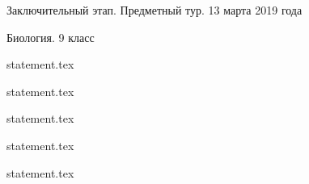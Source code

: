\documentclass[a4paper,11pt, oneside]{book}
\begin{document}
\vspace{-3mm}
\vspace{-5mm}

\normalsize

\begin{center}
    Заключительный этап. Предметный тур. 13 марта 2019 года
    
    Биология. 9 класс
\end{center}

\parindent=0cm

{statement.tex}

{statement.tex}

{statement.tex}

\newpage

{statement.tex}

\newpage

{statement.tex}
\end{document}

